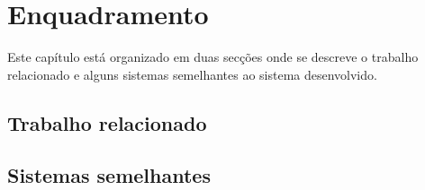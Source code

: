 \chapter{Enquadramento}\label{ch:enquadramento}

Este capítulo está organizado em duas secções onde se descreve o trabalho relacionado e alguns sistemas semelhantes ao sistema desenvolvido.


\section{Trabalho relacionado}
\lipsum[1-2]


\section{Sistemas semelhantes}
\lipsum[3-5]

